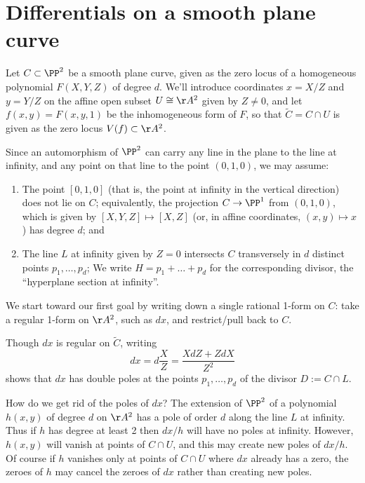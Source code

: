 \section{Differentials on a smooth plane curve}\label{canonical series on smooth plane curves}

Let $C \subset \PP^2$  be a smooth plane curve, given as the zero locus of a homogeneous polynomial $F(X,Y,Z)$ of degree $d$. We'll introduce coordinates $x = X/Z$ and $y = Y/Z$ on the affine open subset $U \cong \AA^2$ given by $Z \neq 0$, and let $f(x,y) = F(x, y,1)$ be the inhomogeneous form of $F$, so that $\widetilde C = C \cap U$ is given as the zero locus $V(f) \subset  \AA^2$. 

Since an automorphism of $\PP^2$ can carry any line in the plane to the line at infinity, and any point on that line to the point $(0,1,0)$, we may assume:
\begin{enumerate}
\item The point $[0,1,0]$ (that is, the point at infinity in the vertical direction) does not lie on $C$; equivalently,  the projection $C \to \PP^1$ from $(0,1,0)$, which is given by $[X,Y,Z] \mapsto [X,Z]$ (or, in affine coordinates, $(x,y) \mapsto x$)  has degree $d$; and
\item The line $L$ at infinity given by $Z = 0$ intersects $C$ transversely in $d$ distinct points $p_1, \dots, p_d$; We write $H = p_1+ \dots +p_d$ for the corresponding divisor, the ``hyperplane section at infinity''.
\end{enumerate}
 
We start toward our first goal by writing down a single rational 1-form on $C$: 
 take a regular 1-form on $\AA^2$, such as $dx$, and restrict/pull back to $C$. 

Though $dx$ is regular on $\widetilde C$, writing
$$
dx = d\frac{X}{Z} = \frac{X dZ+ Z dX}{Z^2}
$$
 shows that $dx$ has double poles at the points $p_1,\dots,p_d$ of the divisor $D := C \cap L$.
 
How do we get rid of the poles of $dx$? The extension of $\PP^2$ of a polynomial $h(x,y)$ of degree $d$ on
$\AA^2$ has a pole of order $d$ along the line $L$ at infinity. Thus if $h$ has degree at least 2 then $dx/h$ will have no poles at infinity. However, $h(x,y)$ will vanish at points of $C \cap U$, and this may create new poles of $dx/h$. Of course if $h$ vanishes only at  points of $C \cap U$ where $dx$ already has a zero, the zeroes of $h$ may cancel the zeroes of $dx$ rather than creating new poles.
 
